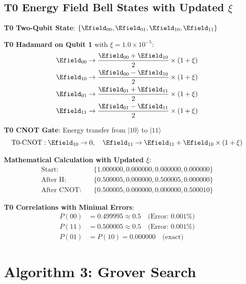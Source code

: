 	\subsection{T0 Energy Field Bell States with Updated $\xi$}
	
	\textbf{T0 Two-Qubit State}: $\{\Efield_{00}, \Efield_{01}, \Efield_{10}, \Efield_{11}\}$
	
	\textbf{T0 Hadamard on Qubit 1} with $\xi = 1.0 \times 10^{-5}$:
	\begin{align}
		\Efield_{00} &\rightarrow \frac{\Efield_{00} + \Efield_{10}}{2} \times (1 + \xi) \\
		\Efield_{10} &\rightarrow \frac{\Efield_{00} - \Efield_{10}}{2} \times (1 + \xi) \\
		\Efield_{01} &\rightarrow \frac{\Efield_{01} + \Efield_{11}}{2} \times (1 + \xi) \\
		\Efield_{11} &\rightarrow \frac{\Efield_{01} - \Efield_{11}}{2} \times (1 + \xi)
	\end{align}
	
	\textbf{T0 CNOT Gate}: Energy transfer from $|10\rangle$ to $|11\rangle$
	\begin{equation}
		\text{T0-CNOT}: \Efield_{10} \rightarrow 0, \quad \Efield_{11} \rightarrow \Efield_{11} + \Efield_{10} \times (1 + \xi)
	\end{equation}
	
	\textbf{Mathematical Calculation with Updated $\xi$}:
	\begin{align}
		\text{Start}: \quad &\{1.000000, 0.000000, 0.000000, 0.000000\} \\
		\text{After H}: \quad &\{0.500005, 0.000000, 0.500005, 0.000000\} \\
		\text{After CNOT}: \quad &\{0.500005, 0.000000, 0.000000, 0.500010\}
	\end{align}
	
	\textbf{T0 Correlations with Minimal Errors}:
	\begin{align}
		P(00) &= 0.499995 \approx 0.5 \quad \text{(Error: 0.001\%)} \\
		P(11) &= 0.500005 \approx 0.5 \quad \text{(Error: 0.001\%)} \\
		P(01) &= P(10) = 0.000000 \quad \text{(exact)}
	\end{align}
	
	\section{Algorithm 3: Grover Search}
	

